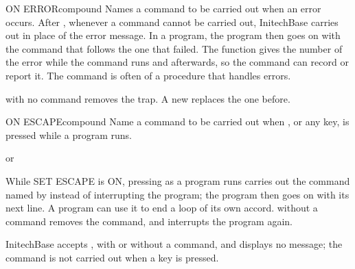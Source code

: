 \begin{XbaseEntry}{ON ERROR}{compound}
%
Names a command to be carried out when an error occurs.
\Syntax
{}
\Usage
After  , whenever a command cannot be carried out,
InitechBase carries out  in place of the error message.  In a
program, the program then goes on with the command that follows the one that
failed.  The function  gives the number of the error while the
command runs and afterwards, so the command can record or report it.  The
command is often  of a procedure that handles errors.

 with no command removes the trap.  A new  replaces
the one before.
\Examples
{}
\end{XbaseEntry}

\begin{XbaseEntry}{ON ESCAPE}{compound}
Name a command to be carried out when , or any key, is pressed while
a program runs.
\Syntax
{}
\par or\par
{}
\Usage
While SET ESCAPE is ON, pressing  as a program runs carries out the
command named by  instead of interrupting the program; the
program then goes on with its next line.  A program can use it to end a loop
of its own accord.   without a command removes the command,
and  interrupts the program again.

InitechBase accepts , with or without a command, and displays no
message; the command is not carried out when a key is pressed.
\end{XbaseEntry}

